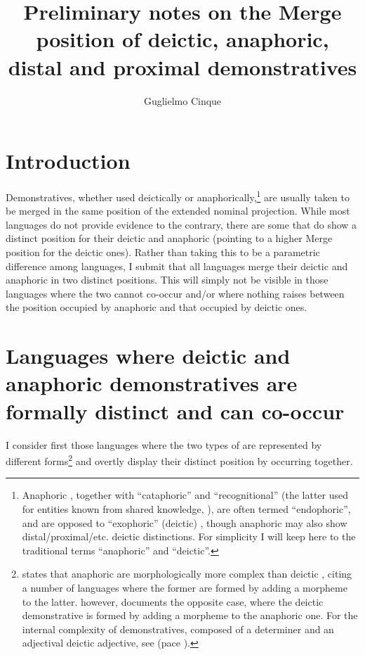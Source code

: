 \documentclass[output=paper]{langsci/langscibook}
\author{Guglielmo Cinque\affiliation{Ca' Foscari University, Venice}}
\title{Preliminary notes on the Merge position of deictic, anaphoric, distal
and proximal demonstratives}
\begin{document}
\glsresetall
{}


\section{Introduction}

Demonstratives, whether used deictically or anaphorically,\footnote{Anaphoric
    , together with \enquote{cataphoric} and
    \enquote{recognitional}  (the latter used for entities known
    from shared knowledge, \citealt{Diessel1999}), are often termed
    \enquote{endophoric}, and are opposed to \enquote{exophoric} (deictic)
    , though anaphoric  may also show
    distal/proximal/etc. deictic distinctions. For simplicity I will keep here
    to the traditional terms \enquote{anaphoric} and \enquote{deictic}.} are
    usually taken to be merged in the same position of the extended nominal
    projection.  While most languages do not provide evidence to the contrary,
    there are some that do show a distinct  position for their deictic and
    anaphoric  (pointing to a higher Merge position for the
    deictic ones).  Rather than taking this to be a
    parametric difference among
    languages, I submit that all languages merge their deictic and anaphoric
     in two distinct positions.  This will simply not be visible
    in those languages where the two cannot co-occur and/or where nothing
    raises between the position occupied by anaphoric  and that
    occupied by deictic ones.

\section{Languages where deictic and anaphoric demonstratives are formally
distinct and can co-occur}

I consider first those languages where the two types of  are
represented by different forms\footnote{\textcite[§5.5]{Diessel1999} states
    that anaphoric  are morphologically more complex than deictic
    , citing a number of languages where the former are formed by
    adding a morpheme to the latter. \textcite[76f]{Dixon2003} however,
    documents the opposite case, where the deictic demonstrative is formed by
    adding a morpheme to the anaphoric one. For the internal complexity of
demonstratives, composed of a determiner and an adjectival deictic adjective,
see \textcites{Leu2007}[§2.5]{Leu2015} (pace \citealt{Kleiber1986}).} and
overtly display their distinct  position by occurring together.
\end{document}
